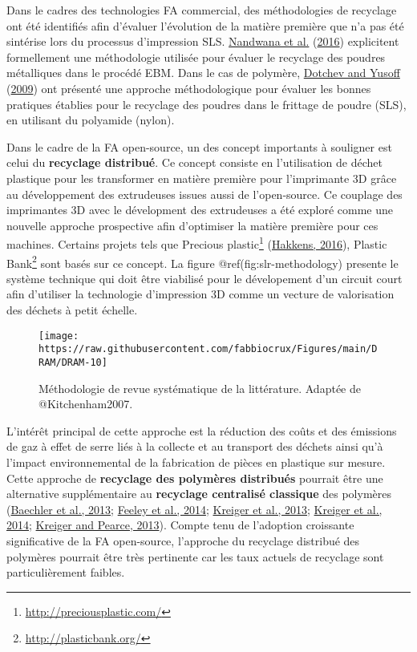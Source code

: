 \documentclass[
]{article}
\begin{document}
Dans le cadres des technologies FA commercial, des méthodologies de
recyclage ont été identifiés afin d'évaluer l'évolution de la matière
première que n'a pas été sintérise lors du processus d'impression SLS.
\protect\hyperlink{ref-Raugel2015}{Nandwana et al.}
(\protect\hyperlink{ref-Raugel2015}{2016}) explicitent formellement une
méthodologie utilisée pour évaluer le recyclage des poudres métalliques
dans le procédé EBM. Dans le cas de polymère,
\protect\hyperlink{ref-Dotchev2009}{Dotchev and Yusoff}
(\protect\hyperlink{ref-Dotchev2009}{2009}) ont présenté une approche
méthodologique pour évaluer les bonnes pratiques établies pour le
recyclage des poudres dans le frittage de poudre (SLS), en utilisant du
polyamide (nylon).

Dans le cadre de la FA open-source, un des concept importants à
souligner est celui du \textbf{recyclage distribué}. Ce concept consiste
en l'utilisation de déchet plastique pour les transformer en matière
première pour l'imprimante 3D grâce au développement des extrudeuses
issues aussi de l'open-source. Ce couplage des imprimantes 3D avec le
dévelopment des extrudeuses a été exploré comme une nouvelle approche
prospective afin d'optimiser la matière première pour ces machines.
Certains projets tels que Precious plastic\footnote{\protect\hyperlink{http:ux2fux2fpreciousplastic.comux2f}{http://preciousplastic.com/}}
(\protect\hyperlink{ref-Hakkens2016}{Hakkens, 2016}), Plastic
Bank\footnote{\protect\hyperlink{http:ux2fux2fplasticbank.orgux2f}{http://plasticbank.org/}}
sont basés sur ce concept. La figure @ref(fig:slr-methodology) presente
le système technique qui doit être viabilisé pour le dévelopement d'un
circuit court afin d'utiliser la technologie d'impression 3D comme un
vecture de valorisation des déchets à petit échelle.

\begin{figure}

{\centering \texttt{[image: https://raw.githubusercontent.com/fabbiocrux/Figures/main/DRAM/DRAM-10]} 

}

\caption{Méthodologie de revue systématique de la littérature. Adaptée de @Kitchenham2007.}\label{fig:slr-methodology}
\end{figure}

L'intérêt principal de cette approche est la réduction des coûts et des
émissions de gaz à effet de serre liés à la collecte et au transport des
déchets ainsi qu'à l'impact environnemental de la fabrication de pièces
en plastique sur mesure. Cette approche de \textbf{recyclage des
polymères distribués} pourrait être une alternative supplémentaire au
\textbf{recyclage centralisé classique} des polymères
(\protect\hyperlink{ref-Baechler2013}{Baechler et al., 2013};
\protect\hyperlink{ref-Feeley2014}{Feeley et al., 2014};
\protect\hyperlink{ref-Anzalone2013}{Kreiger et al., 2013};
\protect\hyperlink{ref-Kreiger2014}{Kreiger et al., 2014};
\protect\hyperlink{ref-Kreiger2013}{Kreiger and Pearce, 2013}). Compte
tenu de l'adoption croissante significative de la FA open-source,
l'approche du recyclage distribué des polymères pourrait être très
pertinente car les taux actuels de recyclage sont particulièrement
faibles.
\end{document}

